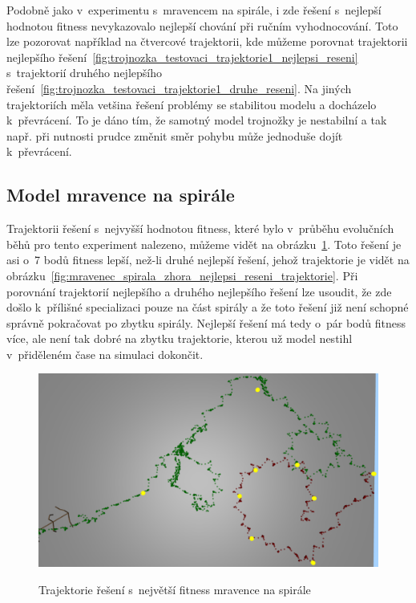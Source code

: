 Podobně jako v~experimentu s~mravencem na spirále, i zde řešení s~nejlepší hodnotou fitness nevykazovalo nejlepší chování při ručním vyhodnocování.
Toto lze pozorovat například na čtvercové trajektorii, kde můžeme porovnat trajektorii nejlepšího řešení~\ref{fig:trojnozka_testovaci_trajektorie1_nejlepsi_reseni} s~trajektorií druhého nejlepšího řešení~\ref{fig:trojnozka_testovaci_trajektorie1_druhe_reseni}.
Na jiných trajektoriích měla vetšina řešení problémy se stabilitou modelu a docházelo k~převrácení.
To je dáno tím, že samotný model trojnožky je nestabilní a tak např. při nutnosti prudce změnit směr pohybu může jednoduše dojít k~převrácení.

\clearpage


\subsection{Model mravence na spirále}
\label{subsec:mravenec_spirala}

Trajektorii řešení s~nejvyšší hodnotou fitness, které bylo v~průběhu evolučních běhů pro tento experiment nalezeno, můžeme vidět na obrázku~\ref{fig:mravenec_spirala_zhora_nejlepsi_reseni_neoptimalni_trajektorie}.
Toto řešení je asi o~7 bodů fitness lepší, než-li druhé nejlepší řešení, jehož trajektorie je vidět na obrázku~\ref{fig:mravenec_spirala_zhora_nejlepsi_reseni_trajektorie}.
Při porovnání trajektorií nejlepšího a druhého nejlepšího řešení lze usoudit, že zde došlo k~přílišné specializaci pouze na část spirály a že toto řešení již není schopné správně pokračovat po zbytku spirály.
Nejlepší řešení má tedy o~pár bodů fitness více, ale není tak dobré na zbytku trajektorie, kterou už model nestihl v~přiděleném čase na simulaci dokončit.

\begin{figure}[h]
    \centering
    {\includegraphics[width=\linewidth]{obrazky/mravenec_spirala_zhora_nejlepsi_reseni_neoptimalni_trajektorie.png}}
    \caption{
    Trajektorie řešení s~největší fitness mravence na spirále
    }
    \label{fig:mravenec_spirala_zhora_nejlepsi_reseni_neoptimalni_trajektorie}
\end{figure}

